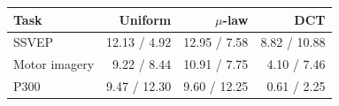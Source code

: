 {\fontsize{8.5}{10.5}\selectfont
\begin{tabular}{lrrr}
\toprule
Task & Uniform & $\mu$-law & DCT\\
\midrule
SSVEP & \textcolor{eegteal}{12.13} / \textcolor{eegcoral}{4.92} & \textcolor{eegteal}{12.95} / \textcolor{eegcoral}{7.58} & \textcolor{eegteal}{8.82} / \textcolor{eegcoral}{10.88}\\
Motor imagery & \textcolor{eegteal}{9.22} / \textcolor{eegcoral}{8.44} & \textcolor{eegteal}{10.91} / \textcolor{eegcoral}{7.75} & \textcolor{eegteal}{4.10} / \textcolor{eegcoral}{7.46}\\
P300 & \textcolor{eegteal}{9.47} / \textcolor{eegcoral}{12.30} & \textcolor{eegteal}{9.60} / \textcolor{eegcoral}{12.25} & \textcolor{eegteal}{0.61} / \textcolor{eegcoral}{2.25}\\
\bottomrule
\end{tabular}}
